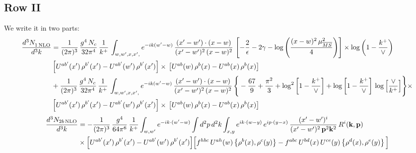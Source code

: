 \documentclass[9pt]{article}
\numberwithin{equation}{section}
\begin{document}
\subsection{Row II}
We write it in two parts:
\begin{align}
     \frac{d^{3}N_{1\,\rm NLO}^{\rm}}{d^{3}k} &  =  \frac{1}{(2\pi)^{3}}\, \frac{g^{4}\,N_{c}}{32\pi^{4}}\,\frac{1}{k^{+}}\, \int_{w, w',x,x',} e^{-ik(w^\prime-w)}\, \frac{(x'-w')\cdot (x-w)}{(x'-w')^{2}\, (x-w)^{2}}\, \left[-\frac{2}{\epsilon}-2\gamma-\log{\left(\frac{(x-w)^{2}\,\mu^{2}_{\overline{MS}}}{4}\right)}\right]\times\log{\left(1-\frac{k^{+}}{\vee}\right)}\notag \\ & \left[U^{ab'}(x')\,\rho^{b'}(x') - U^{ab'}(w')\,\rho^{b'}(x')\right]\times\,\left[U^{ab}(w)\,\rho^{b}(x) - U^{ab}(x)\,\rho^{b}(x)\right]\notag \\ & +\frac{1}{(2\pi)^{3}}\, \frac{g^{4}\,N_{c}}{32\pi^{4}}\,\frac{1}{k^{+}}\, \int_{w, w',x,x',} e^{-ik(w^\prime-w)}\, \frac{(x'-w')\cdot (x-w)}{(x'-w')^{2}\, (x-w)^{2}}\, \Bigg\{ -\frac{67}{9}+\frac{\pi^{2}}{3}+\log^{2}{\left[1-\frac{k^{+}}{\vee}\right]}+\log{\left[1-\frac{k^{+}}{\vee}\right]}\,\log{\left[\frac{\vee}{k^{+}}\right]}\Bigg\}\times\notag \\ & \left[U^{ab'}(x')\,\rho^{b'}(x') - U^{ab'}(w')\,\rho^{b'}(x')\right]\times\,\left[U^{ab}(w)\,\rho^{b}(x) - U^{ab}(x)\,\rho^{b}(x)\right]
\end{align}  
\begin{align}
\frac{d^{3}N_{2b\,\rm NLO}}{d^{3}k} & = -\frac{1}{(2\pi)^{3}}\,\frac{g^{4}}{64\pi^{6}}\,\frac{1}{k^{+}}\int_{w,w'} e^{-ik\cdot(w'-w)}
\int d^{2}p\,d^{2}k\int_{x,y} e^{ik\cdot(w-y)}\,e^{ip\cdot(y-x)}\,\frac{(x'-w')^{i}}{(x'-w')^{2}\,\mathbf{p}^{2}\mathbf{k}^{2}}\,R^{i}(\mathbf{k},\mathbf{p})\notag\\
&\times\Big[U^{ab'}(x')\,\rho^{b'}(x')-U^{ab'}(w')\,\rho^{b'}(x')\Big]
\Big[f^{hbc}\,U^{ah}(w)\left\{\rho^{b}(x),\rho^{c}(y)\right\}-f^{abc}\,U^{bd}(x)\,U^{ce}(y)\left\{\rho^{d}(x),\rho^{e}(y)\right\}\Big]
\end{align}
\end{document}
